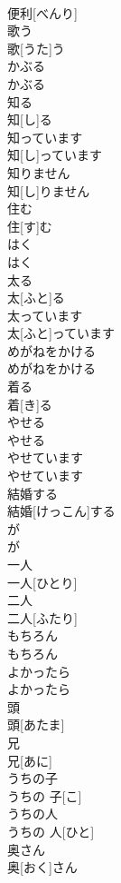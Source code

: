 \documentclass[8pt]{extreport}
\begin{document}
\begin{CJK}{UTF8}{min}
\\	便利[べんり]
\\	歌う	
\\	歌[うた]う
\\	かぶる	
\\	かぶる
\\	知る	
\\	知[し]る
\\	知っています	
\\	知[し]っています
\\	知りません	
\\	知[し]りません
\\	住む	
\\	住[す]む
\\	はく	
\\	はく
\\	太る	
\\	太[ふと]る
\\	太っています	
\\	太[ふと]っています
\\	めがねをかける	
\\	めがねをかける
\\	着る	
\\	着[き]る
\\	やせる	
\\	やせる
\\	やせています	
\\	やせています
\\	結婚する	
\\	結婚[けっこん]する
\\	が	
\\	が
\\	一人	
\\	一人[ひとり]
\\	二人	
\\	二人[ふたり]
\\	もちろん	
\\	もちろん
\\	よかったら	
\\	よかったら
\\	頭	
\\	頭[あたま]
\\	兄	
\\	兄[あに]
\\	うちの子	
\\	うちの 子[こ]
\\	うちの人	
\\	うちの 人[ひと]
\\	奥さん	
\\	奥[おく]さん

\end{CJK}
\end{document}
